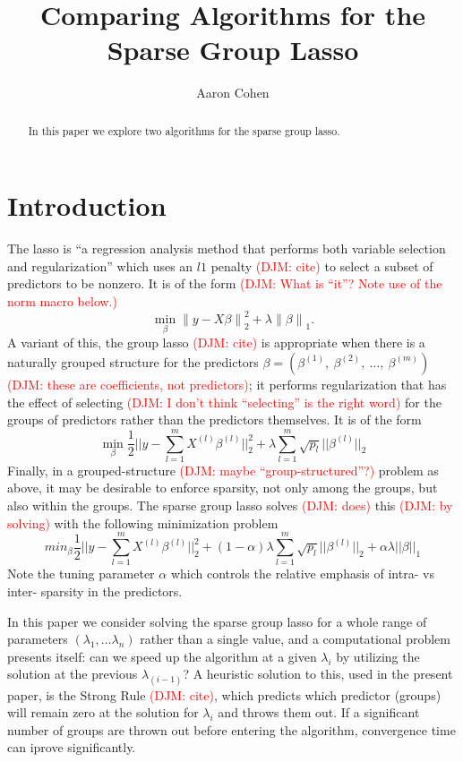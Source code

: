 \documentclass[titlepage]{article}
\title{Comparing Algorithms for the Sparse Group Lasso}
\author{Aaron Cohen}
\newcommand{\djm}[1]{\textcolor{red}{(DJM: #1)}}
\newcommand{\norm}[1]{\left\lVert #1 \right\rVert}
\begin{document}
    \maketitle
    \begin{abstract}
        In this paper we explore two algorithms for the sparse group lasso. 
    \end{abstract}

\section{Introduction}
The lasso is ``a regression analysis method that performs both variable selection and regularization'' which uses an $l1$ penalty \djm{cite} to select a subset of predictors to be nonzero. It is of the form \djm{What is ``it''? Note use of the norm macro below.}
\[
\min_{\beta} \norm{y-X\beta}_2^2 + \lambda \norm{\beta}_1.
\]
A variant of this, the group lasso \djm{cite} is appropriate when there is a naturally grouped structure for the predictors $\beta = (\beta^{(1)},\ \beta^{(2)},\ \dots, \ \beta^{(m)})$ \djm{these are coefficients, not predictors}; it performs regularization that has the effect of selecting \djm{I don't think ``selecting'' is the right word} for the groups of predictors rather than the predictors themselves. It is of the form 
\[
\min_{\beta}\frac{1}{2}||y-\sum_{l=1}^mX^{(l)}\beta^{(l)}||_2^2 + \lambda\sum_{l=1}^m\sqrt{p_l}||\beta^{(l)}||_2
\]
Finally, in a grouped-structure \djm{maybe ``group-structured''?} problem as above, it may be desirable to enforce sparsity, not only among the groups, but also within the groups. The sparse group lasso solves \djm{does} this \djm{by solving} with the following minimization problem
\begin{equation}
  \label{eq:1}
min_{\beta}\frac{1}{2}||y-\sum_{l=1}^mX^{(l)}\beta^{(l)}||_2^2 + (1-\alpha)\lambda\sum_{l=1}^m\sqrt{p_l}||\beta^{(l)}||_2+\alpha\lambda||\beta||_1
\end{equation}
Note the tuning parameter $\alpha$ which controls the relative emphasis of intra- vs inter- sparsity in the predictors.

In this paper we consider solving the sparse group lasso for a whole range of parameters $(\lambda_1,\dots \lambda_n)$ rather than a single value, and a computational problem presents itself:  can we speed up the algorithm at a  given $\lambda_i$ by utilizing the solution at the previous $\lambda_{(i-1)}$? A heuristic solution to this, used in the present paper, is the Strong Rule \djm{cite}, which predicts which predictor (groups) will remain zero at the solution for $\lambda_i$ and throws them out. If a significant number of groups are thrown out before entering the algorithm, convergence time can iprove significantly.
\end{document}
